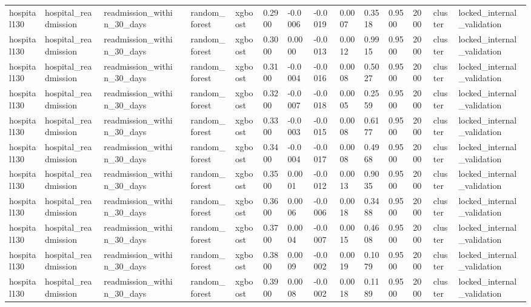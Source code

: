 \begin{tabular}{lllllllllllllll}
hospital130 & hospital\_readmission & readmission\_within\_30\_days &  & random\_forest & xgboost & 0.2900 & -0.0006 & -0.0019 & 0.0007 & 0.3518 & 0.9500 & 2000 & cluster & locked\_internal\_validation \\
hospital130 & hospital\_readmission & readmission\_within\_30\_days &  & random\_forest & xgboost & 0.3000 & 0.0000 & -0.0013 & 0.0012 & 0.9915 & 0.9500 & 2000 & cluster & locked\_internal\_validation \\
hospital130 & hospital\_readmission & readmission\_within\_30\_days &  & random\_forest & xgboost & 0.3100 & -0.0004 & -0.0016 & 0.0008 & 0.5027 & 0.9500 & 2000 & cluster & locked\_internal\_validation \\
hospital130 & hospital\_readmission & readmission\_within\_30\_days &  & random\_forest & xgboost & 0.3200 & -0.0007 & -0.0018 & 0.0005 & 0.2559 & 0.9500 & 2000 & cluster & locked\_internal\_validation \\
hospital130 & hospital\_readmission & readmission\_within\_30\_days &  & random\_forest & xgboost & 0.3300 & -0.0003 & -0.0015 & 0.0008 & 0.6177 & 0.9500 & 2000 & cluster & locked\_internal\_validation \\
hospital130 & hospital\_readmission & readmission\_within\_30\_days &  & random\_forest & xgboost & 0.3400 & -0.0004 & -0.0017 & 0.0008 & 0.4968 & 0.9500 & 2000 & cluster & locked\_internal\_validation \\
hospital130 & hospital\_readmission & readmission\_within\_30\_days &  & random\_forest & xgboost & 0.3500 & 0.0001 & -0.0012 & 0.0013 & 0.9035 & 0.9500 & 2000 & cluster & locked\_internal\_validation \\
hospital130 & hospital\_readmission & readmission\_within\_30\_days &  & random\_forest & xgboost & 0.3600 & 0.0006 & -0.0006 & 0.0018 & 0.3488 & 0.9500 & 2000 & cluster & locked\_internal\_validation \\
hospital130 & hospital\_readmission & readmission\_within\_30\_days &  & random\_forest & xgboost & 0.3700 & 0.0004 & -0.0007 & 0.0015 & 0.4608 & 0.9500 & 2000 & cluster & locked\_internal\_validation \\
hospital130 & hospital\_readmission & readmission\_within\_30\_days &  & random\_forest & xgboost & 0.3800 & 0.0009 & -0.0002 & 0.0019 & 0.1079 & 0.9500 & 2000 & cluster & locked\_internal\_validation \\
hospital130 & hospital\_readmission & readmission\_within\_30\_days &  & random\_forest & xgboost & 0.3900 & 0.0008 & -0.0002 & 0.0018 & 0.1189 & 0.9500 & 2000 & cluster & locked\_internal\_validation \\

\end{tabular}
